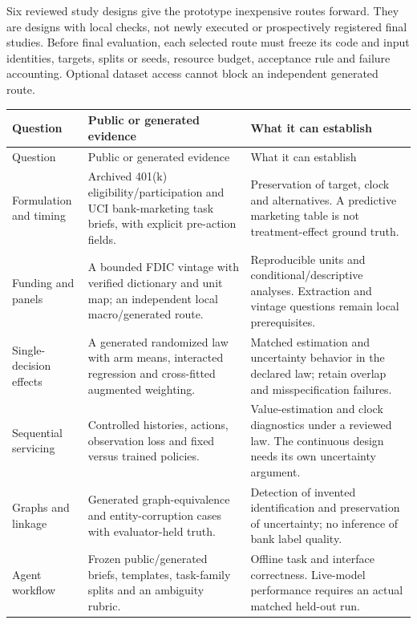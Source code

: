 Six reviewed study designs give the prototype inexpensive routes
forward. They are designs with local checks, not newly executed or
prospectively registered final studies. Before final evaluation, each
selected route must freeze its code and input identities, targets,
splits or seeds, resource budget, acceptance rule and failure
accounting. Optional dataset access cannot block an independent
generated route. \citep{sp13_public}

\begin{longtable}{@{}p{.22\linewidth}p{.36\linewidth}p{.34\linewidth}@{}}
\toprule
Question & Public or generated evidence & What it can establish \\
\midrule
\endfirsthead
\toprule
Question & Public or generated evidence & What it can establish \\
\midrule
\endhead
Formulation and timing & Archived 401(k) eligibility/participation and UCI bank-marketing task briefs, with explicit pre-action fields. & Preservation of target, clock and alternatives. A predictive marketing table is not treatment-effect ground truth. \\
Funding and panels & A bounded FDIC vintage with verified dictionary and unit map; an independent local macro/generated route. & Reproducible units and conditional/descriptive analyses. Extraction and vintage questions remain local prerequisites. \\
Single-decision effects & A generated randomized law with arm means, interacted regression and cross-fitted augmented weighting. & Matched estimation and uncertainty behavior in the declared law; retain overlap and misspecification failures. \\
Sequential servicing & Controlled histories, actions, observation loss and fixed versus trained policies. & Value-estimation and clock diagnostics under a reviewed law. The continuous design needs its own uncertainty argument. \\
Graphs and linkage & Generated graph-equivalence and entity-corruption cases with evaluator-held truth. & Detection of invented identification and preservation of uncertainty; no inference of bank label quality. \\
Agent workflow & Frozen public/generated briefs, templates, task-family splits and an ambiguity rubric. & Offline task and interface correctness. Live-model performance requires an actual matched held-out run. \\
\bottomrule
\end{longtable}

